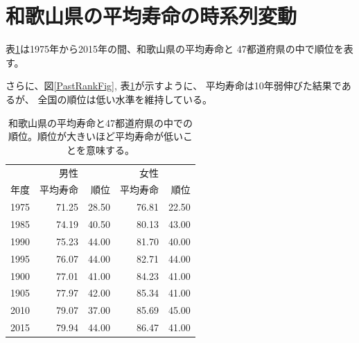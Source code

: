
\section{和歌山県の平均寿命の時系列変動}

表\ref{PastRank}は1975年から2015年の間、和歌山県の平均寿命と
47都道府県の中で順位を表す。

さらに、図\ref{PastRankFig}, 表\ref{PastRank}が示すように、
平均寿命は10年弱伸びた結果であるが、
全国の順位は低い水準を維持している。


\begin{table}[ht]
\label{PastRank}
\caption{和歌山県の平均寿命と47都道府県の中での順位。順位が大きいほど平均寿命が低いことを意味する。}
\centering
\begin{tabular}{r|rr|rr}
  \hline
	 & 男性 &  & 女性 &  \\
	年度 & 平均寿命 & 順位 & 平均寿命 & 順位 \\
  \hline
  1975 & 71.25 & 28.50 & 76.81 & 22.50 \\
  1985 & 74.19 & 40.50 & 80.13 & 43.00 \\
  1990 & 75.23 & 44.00 & 81.70 & 40.00 \\
  1995 & 76.07 & 44.00 & 82.71 & 44.00 \\
  1900 & 77.01 & 41.00 & 84.23 & 41.00 \\
  1905 & 77.97 & 42.00 & 85.34 & 41.00 \\
  2010 & 79.07 & 37.00 & 85.69 & 45.00 \\
  2015 & 79.94 & 44.00 & 86.47 & 41.00 \\
   \hline
\end{tabular}

\end{table}





